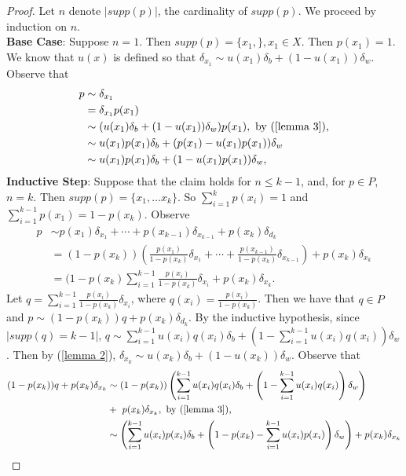 \documentclass[12pt]{article}
\theoremstyle{definition}
\theoremstyle{remark}
\newcommand{\abs}[1]{\left\vert#1\right\vert}
\begin{document}
\begin{proof}
  Let $n$ denote $\abs{supp(p)}$, the cardinality of $supp(p)$. We proceed by induction on $n$. \\
  \textbf{Base Case}: Suppose $n = 1$. Then $supp(p) = \{ x_1, \}, x_1 \in X$. Then $p(x_1) = 1$. We know that $u(x)$ is defined so that $\delta_{x_1} \sim u(x_1)\delta_b + (1 - u(x_1))\delta_w$. Observe that
  \begin{align*}
    p &\sim \delta_{x_1} \\
    &= \delta_{x_1}p(x_1) \\
    &\sim (u(x_1)\delta_b + (1 - u(x_1))\delta_w)p(x_1), \text{ by (\ref{lemma 3}),}  \\
    &\sim u(x_1)p(x_1)\delta_b + (p(x_1) - u(x_1)p(x_1))\delta_w \\
    &\sim u(x_1)p(x_1)\delta_b + (1 - u(x_1)p(x_1))\delta_w,
  \end{align*}
  \textbf{Inductive Step}: Suppose that the claim holds for $n \leq k - 1$, and, for $p \in P$, $n = k$. Then $supp(p) = \{x_1, \ldots x_{k} \}$. So $\sum_{i = 1}^{k}p(x_i) = 1$ and $\sum_{i = 1}^{k-1}p(x_1) = 1 - p(x_k)$. Observe
  \begin{align*}
    p &\sim p(x_1)\delta_{x_1} + \cdots + p(x_{k-1})\delta_{x_{k-1}} + p(x_k)\delta_{d_k} \\
    &= (1 - p(x_k)) \left( \frac{p(x_1)}{1 - p(x_k)}\delta_{x_1} + \cdots + \frac{p(x_{k-1})}{1 - p(x_k)}\delta_{x_{k-1}} \right) + p(x_k)\delta_{x_k} \\
    &= (1 - p(x_k) \sum_{i = 1}^{k - 1} \frac{p(x_i)}{1 - p(x_k)}\delta_{x_i} + p(x_k)\delta_{x_k}.
  \end{align*}
  Let $q = \sum_{i = 1}^{k - 1} \frac{p(x_i)}{1 - p(x_k)}\delta_{x_i}$, where $q(x_i) = \frac{p(x_i)}{1 - p(x_k)}$. Then we have that $q \in P$ and $p \sim (1 - p(x_k))q + p(x_k)\delta_{d_k}$.
  By the inductive hypothesis, since $\abs{supp(q) = k-1}$, $q \sim \sum_{i = 1}^{k - 1}u(x_i)q(x_i)\delta_b + (1 - \sum_{i = 1}^{k - 1}u(x_i)q(x_i))\delta_w$. Then by (\ref{lemma 2}), $\delta_{x_k} \sim u(x_k)\delta_b + (1 - u(x_k))\delta_w$.
  Observe that
  \begin{align*}
    (1 - p(x_k))q + p(x_k)\delta_{x_k} &\sim (1 - p(x_k))\left(\sum_{i = 1}^{k - 1}u(x_i)q(x_i)\delta_b + \left(1 - \sum_{i = 1}^{k - 1}u(x_i)q(x_i)\right)\delta_w\right)  \\ &+ \ p(x_k)\delta_{x_k}, \text{ by (\ref{lemma 3}),} \\
    &\sim \left(\sum_{i = 1}^{k - 1}u(x_i)p(x_i)\delta_b + \left(1 - p(x_k) - \sum_{i = 1}^{k - 1}u(x_i)p(x_i)\right)\delta_w\right) +  p(x_k)\delta_{x_k} \\

\end{align*}
\end{proof}
\end{document}
